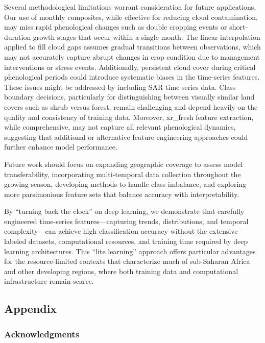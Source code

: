 \documentclass[
  journal,
  twocolumn]{IEEEtran}
\begin{document}
Several methodological limitations warrant consideration for future
applications. Our use of monthly composites, while effective for
reducing cloud contamination, may miss rapid phenological changes such
as double cropping events or short-duration growth stages that occur
within a single month. The linear interpolation applied to fill cloud
gaps assumes gradual transitions between observations, which may not
accurately capture abrupt changes in crop condition due to management
interventions or stress events. Additionally, persistent cloud cover
during critical phenological periods could introduce systematic biases
in the time-series features. These issues might be addressed by
including SAR time series data. Class boundary decisions, particularly
for distinguishing between visually similar land covers such as shrub
versus forest, remain challenging and depend heavily on the quality and
consistency of training data. Moreover, xr\_fresh feature extraction,
while comprehensive, may not capture all relevant phenological dynamics,
suggesting that additional or alternative feature engineering approaches
could further enhance model performance.

Future work should focus on expanding geographic coverage to assess
model transferability, incorporating multi-temporal data collection
throughout the growing season, developing methods to handle class
imbalance, and exploring more parsimonious feature sets that balance
accuracy with interpretability.

By ``turning back the clock'' on deep learning, we demonstrate that
carefully engineered time-series features---capturing trends,
distributions, and temporal complexity---can achieve high classification
accuracy without the extensive labeled datasets, computational
resources, and training time required by deep learning architectures.
This ``lite learning'' approach offers particular advantages for the
resource-limited contexts that characterize much of sub-Saharan Africa
and other developing regions, where both training data and computational
infrastructure remain scarce.

\newpage

\hypertarget{appendix}{%
\subsection{Appendix}\label{appendix}}

\hypertarget{acknowledgments}{%
\subsubsection{Acknowledgments}\label{acknowledgments}}
\end{document}
